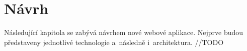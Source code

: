 \chapter{Návrh}
Následující kapitola se zabývá návrhem nové webové aplikace. Nejprve budou představeny jednotlivé technologie a~následně i~architektura. //TODO 



